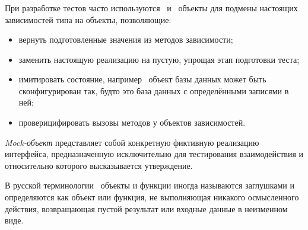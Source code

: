 \subsubsection{}
\label{sec:testing:unit:mock}

При разработке тестов часто используются \mock \, и \stub \, объекты для подмены настоящих зависимостей типа на объекты, позволяющие:

\begin{itemize}
	\item вернуть подготовленные значения из методов зависимости;
	\item заменить настоящую реализацию на пустую, упрощая этап подготовки теста;
	\item имитировать состояние, например \stub \, объект базы данных может быть сконфигурирован так, будто это база данных с определёнными записями в ней;
	\item проверицифировать вызовы методов у объектов зависимостей.
\end{itemize}

\textit{Mock-объект} представляет собой конкретную фиктивную реализацию интерфейса, предназначенную исключительно для тестирования взаимодействия и относительно которого высказывается утверждение. \cite{wiki:mock}

В русской терминологии \stub \, объекты и функции иногда называются заглушками и определяются как объект или функция, не выполняющая никакого осмысленного действия, возвращающая пустой результат или входные данные в неизменном виде. \cite{wiki:stub}